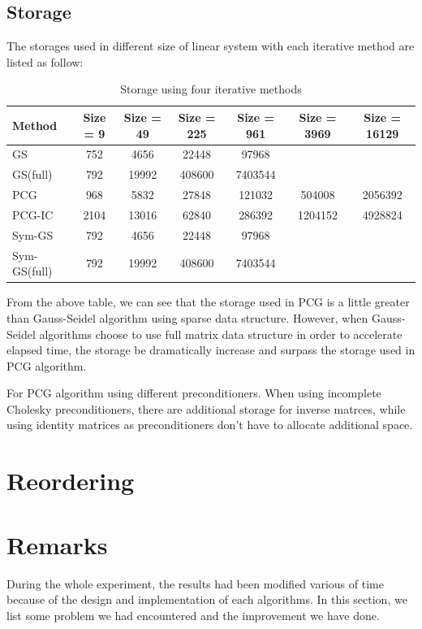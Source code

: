 \documentclass{article}
\begin{document}
\subsection{Storage}
The storages used in different size of linear system with each iterative method are listed as follow:


\begin{table}[h]
\begin{center}
\begin{tabular}{lcccccc}
\hline
Method & Size = 9 & Size = 49 & Size = 225 & Size = 961 & Size = 3969 & Size = 16129\\
\hline
GS & 752 & 4656 & 22448 & 97968 & &\\
GS(full) & 792 & 19992 & 408600 & 7403544 & &\\
PCG & 968 & 5832 & 27848 & 121032 & 504008 & 2056392\\
PCG-IC & 2104 & 13016 & 62840 & 286392 & 1204152 & 4928824\\
Sym-GS & 792 & 4656 & 22448 & 97968 & &\\
Sym-GS(full) & 792 & 19992 & 408600 & 7403544 & &\\
\hline
\end{tabular}
\caption{Storage using four iterative methods}
\end{center}
\end{table}

From the above table, we can see that the storage used in PCG is a little greater than Gauss-Seidel algorithm using sparse data structure. However, when Gauss-Seidel algorithms choose to use full matrix data structure in order to accelerate elapsed time, the storage be dramatically increase and surpass the storage used in PCG algorithm. 

For PCG algorithm using different preconditioners. When using incomplete Cholesky preconditioners, there are additional storage for inverse matrces, while using identity matrices as preconditioners don't have to allocate additional space.

\section{Reordering}


\section{Remarks}

During the whole experiment, the results had been modified various of time because of the design and implementation of each algorithms. In this section, we list some problem we had encountered and the improvement we have done.
\end{document}
